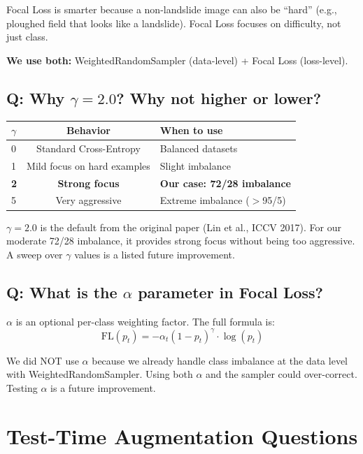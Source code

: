 \documentclass[11pt]{article}
\begin{document}
Focal Loss is smarter because a non-landslide image can also be ``hard'' (e.g., ploughed field that looks like a landslide). Focal Loss focuses on difficulty, not just class.

\textbf{We use both:} WeightedRandomSampler (data-level) + Focal Loss (loss-level).

\subsection{Q: Why $\gamma = 2.0$? Why not higher or lower?}

\begin{table}[H]
    \centering
    \renewcommand{\arraystretch}{1.2}
    \begin{tabular}{lcl}
        \toprule
        $\gamma$ & \textbf{Behavior} & \textbf{When to use} \\
        \midrule
        0 & Standard Cross-Entropy & Balanced datasets \\
        1 & Mild focus on hard examples & Slight imbalance \\
        \textbf{2} & \textbf{Strong focus} & \textbf{Our case: 72/28 imbalance} \\
        5 & Very aggressive & Extreme imbalance ($>$95/5) \\
        \bottomrule
    \end{tabular}
\end{table}

$\gamma = 2.0$ is the default from the original paper (Lin et al., ICCV 2017). For our moderate 72/28 imbalance, it provides strong focus without being too aggressive. A sweep over $\gamma$ values is a listed future improvement.

\subsection{Q: What is the $\alpha$ parameter in Focal Loss?}

$\alpha$ is an optional per-class weighting factor. The full formula is:
\[
\text{FL}(p_t) = -\alpha_t (1 - p_t)^\gamma \cdot \log(p_t)
\]

We did NOT use $\alpha$ because we already handle class imbalance at the data level with WeightedRandomSampler. Using both $\alpha$ and the sampler could over-correct. Testing $\alpha$ is a future improvement.

\section{Test-Time Augmentation Questions}
\end{document}
